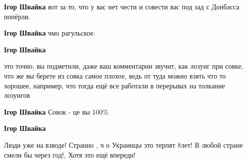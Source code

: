 \begin{itemize}
\begin{itemize}
 
\textbf{Ігор Швайка} вот за то, что у вас нет чести и совести вас под зад с Донбасса попёрли.

 
\textbf{Ігор Швайка} чмо рагульское.

 
\textbf{Ігор Швайка} 

это точно, вы подметили, даже ваш комментарии звучит, как лозунг при совке, что
же вы берете из совка самое плохое, ведь от туда можно взять что то хорошее,
например, что тогда ещё все работали в перерывах на толкание лозунгов

 
\textbf{Ігор Швайка} Совок - це вы 100\%

 
\textbf{Ігор Швайка}

Люди уже на взводе! Странно , ч о Украинцы это терпят 8лет! В любой стране
смели бы через год!, Хотя это ещё впереди!


 

\end{itemize}
\end{itemize}
